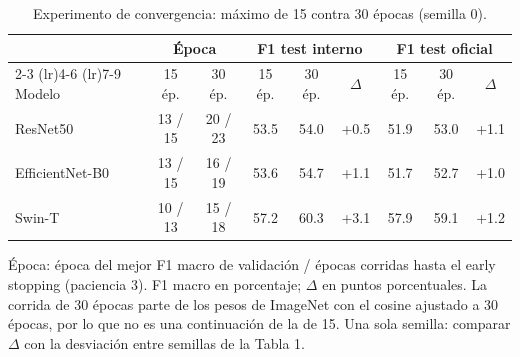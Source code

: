 \begin{table}[t]
\centering
\caption{Experimento de convergencia: máximo de 15 contra 30 épocas (semilla 0).}
\label{tab:tabla5_convergencia}
\footnotesize
\begin{tabular}{lcccccccc}
\toprule
 & \multicolumn{2}{c}{Época} & \multicolumn{3}{c}{F1 test interno} & \multicolumn{3}{c}{F1 test oficial} \\
\cmidrule(lr){2-3} \cmidrule(lr){4-6} \cmidrule(lr){7-9}
Modelo & 15 ép. & 30 ép. & 15 ép.  & 30 ép.  & $\Delta$ & 15 ép.   & 30 ép.   & $\Delta$  \\
\midrule
ResNet50 & 13 / 15 & 20 / 23 & 53.5 & 54.0 & +0.5 & 51.9 & 53.0 & +1.1 \\
EfficientNet-B0 & 13 / 15 & 16 / 19 & 53.6 & 54.7 & +1.1 & 51.7 & 52.7 & +1.0 \\
Swin-T & 10 / 13 & 15 / 18 & 57.2 & 60.3 & +3.1 & 57.9 & 59.1 & +1.2 \\
\bottomrule
\end{tabular}
\par\vspace{2pt}
\parbox{\linewidth}{\scriptsize Época: época del mejor F1 macro de validación / épocas corridas hasta el early stopping (paciencia 3). F1 macro en porcentaje; $\Delta$ en puntos porcentuales. La corrida de 30 épocas parte de los pesos de ImageNet con el cosine ajustado a 30 épocas, por lo que no es una continuación de la de 15. Una sola semilla: comparar $\Delta$ con la desviación entre semillas de la Tabla 1.}
\end{table}
